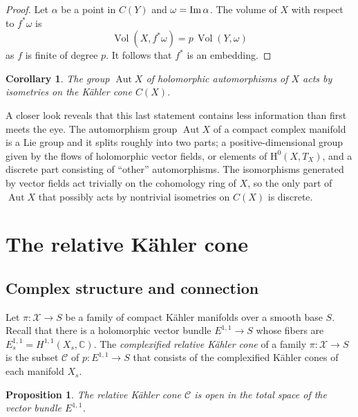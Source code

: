 \documentclass[11pt,a4paper]{amsart}
\newtheorem{prop}[theo]{Proposition}
\newtheorem{coro}[theo]{Corollary}
\theoremstyle{definition}
\theoremstyle{remark}
\newcommand{\CC}{\mathbb{C}}
\newcommand{\Aut}{\mathop{\mathrm{Aut}}}
\newcommand{\Vol}{\mathop{\mathrm{Vol}}}
\def\Im{\mathop{\rm Im}}
\def\cX{\mathcal{X}}
\def\coho#1{\mathrm{H}^{#1}}
\def\kf{\omega}
\def\ckf{\alpha}
\def\KC{C}
\def\RKC{\mathcal{\KC}}
\begin{document}
\begin{proof}
Let $\ckf$ be a point in $\KC(Y)$ and $\kf = \Im \ckf$. The volume of
$X$ with respect to $f^*\kf$ is
\begin{equation*}
  \Vol(X,f^*\kf) = p \, \Vol(Y,\kf)
\end{equation*}
as $f$ is finite of degree $p$. It follows that $f^*$ is an embedding.
\end{proof}

\begin{coro}
The group $\Aut X$ of holomorphic automorphisms of $X$ acts by
isometries on the K\"{a}hler cone $\KC(X)$.
\end{coro}

A closer look reveals that this last statement contains less information
than first meets the eye. The automorphism group $\Aut X$ of a compact
complex manifold is a Lie group and it splits roughly into two parts; a
positive-dimensional group given by the flows of holomorphic vector
fields, or elements of $\coho{0}(X,T_X)$, and a discrete part consisting of
``other'' automorphisms. The isomorphisms generated by vector fields act
trivially on the cohomology ring of $X$, so the only part of $\Aut X$
that possibly acts by nontrivial isometries on $\KC(X)$ is discrete.


\section{The relative K\"{a}hler cone}
\label{sefi}


\subsection*{Complex structure and connection}

Let $\pi : \cX \to S$ be a family of compact K\"{a}hler manifolds over
a smooth base $S$. Recall that there is a holomorphic vector bundle
$E^{1,1} \to S$ whose fibers are $E^{1,1}_s = H^{1,1}(X_s,\CC)$. The
\emph{complexified relative K\"{a}hler cone} of a family $\pi : \cX
\to   S$ is the subset $\RKC$ of $p : E^{1,1} \to S$ that consists
of the complexified K\"{a}hler cones of each manifold $X_s$.

\begin{prop}
The relative K\"{a}hler cone $\RKC$ is open in the total space of
the vector bundle $E^{1,1}$.
\end{prop}
\end{document}
